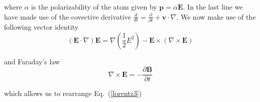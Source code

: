 \documentclass[twocolumn,english,pra,aps,superscriptaddress,floatfix]{revtex4-1}
\begin{document}
where $\alpha$ is the polarizability of the atom given by $\mathbf{p}=\alpha\mathbf{E}$.  In the last line we have made use of the covective derivative $\frac{d}{dt}=\frac{\partial}{\partial t}+\mathbf{v}\cdot\nabla$. We now make use of the following vector identity
\begin{equation}
\left(\mathbf{E}\cdot\nabla\right)\mathbf{E}=\nabla\left(\frac{1}{2}E^2\right)-\mathbf{E}\times\left(\nabla\times\mathbf{E}\right)
\label{vectorid}
\end{equation}

and Faraday's law
\begin{equation}
\nabla\times\mathbf{E}=-\frac{\partial\mathbf{B}}{\partial t}
\label{faraday}
\end{equation}

which allows us to rearrange Eq.\ (\ref{lorentz3})
\end{document}
